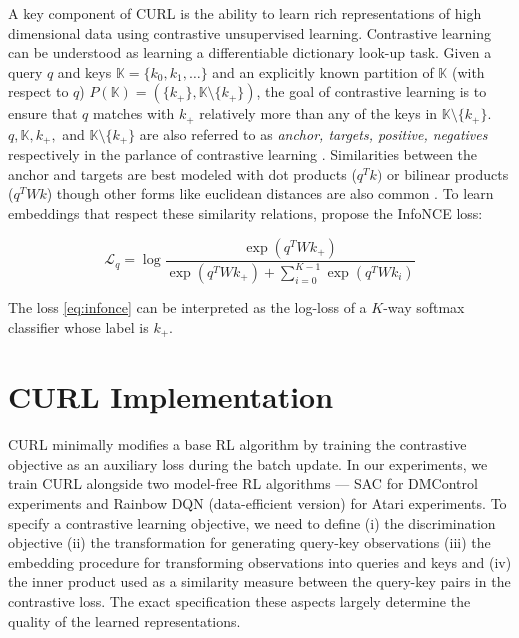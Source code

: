 \documentclass{article}
\begin{document}
A key component of CURL is the ability to learn rich representations of high dimensional data using contrastive unsupervised learning. Contrastive learning \cite{hadsell2006dimensionality, lecun2006tutorial, oord2018representation, wu2018unsupervised, he2019momentum} can be understood as learning a differentiable dictionary look-up task. Given a query $q$ and keys $\mathbb{K} = \{k_0, k_1, \dots \}$ and an explicitly known partition of $\mathbb{K}$ (with respect to $q$) $P(\mathbb{K}) = ( \{k_{+}\}, \mathbb{K} \setminus \{k_{+}\} )$, the goal of contrastive learning is to ensure that $q$ matches with $k_{+}$ relatively more than any of the keys in $\mathbb{K} \setminus \{k_{+}\}$. $q, \mathbb{K}, k_{+},$ and $\mathbb{K} \setminus \{k_{+}\}$ are also referred to as {\it anchor, targets, positive, negatives} respectively in the parlance of contrastive learning \cite{oord2018representation, he2019momentum}. Similarities between the anchor and targets are best modeled with dot products ($q^Tk)$ \cite{wu2018unsupervised, he2019momentum} or bilinear products ($q^TWk$) \cite{oord2018representation, henaff2019data} though other forms like euclidean distances are also common \cite{schroff2015facenet, wang2015unsupervised}. To learn embeddings that respect these similarity relations, \citet{oord2018representation} propose the InfoNCE loss:

\begin{equation}\label{eq:infonce}
   \mathcal L_{q} = \log \frac{\exp(q^T W k_{+})}{ \exp(q^T W k_{+}) +  \sum_{i=0}^{K-1} \exp(q^T W k_{i})}
\end{equation}

The loss \ref{eq:infonce} can be interpreted as the log-loss of a $K$-way softmax classifier whose label is $k_{+}$. 


\section{CURL Implementation}

CURL minimally modifies a base RL algorithm by training the contrastive objective as an auxiliary loss during the batch update. In our experiments, we train CURL alongside two model-free RL algorithms --- SAC for DMControl experiments and Rainbow DQN (data-efficient version) for Atari experiments. To specify a contrastive learning objective, we need to define (i) the discrimination objective (ii) the transformation for generating query-key observations (iii) the embedding procedure for transforming observations into queries and keys and (iv) the inner product used as a similarity measure between the query-key pairs in the contrastive loss. The exact specification these aspects largely determine the quality of the learned representations.
\end{document}
